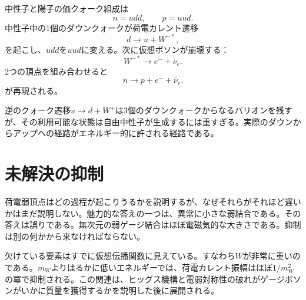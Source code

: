 中性子と陽子の価クォーク組成は
\begin{equation}
n=udd,
\qquad
p=uud.
\end{equation}
中性子中の1個のダウンクォークが荷電カレント遷移
\begin{equation}
d\longrightarrow u+W^{-*},
\end{equation}
を起こし、\(udd\)を\(uud\)に変える。次に仮想ボソンが崩壊する：
\begin{equation}
W^{-*}\longrightarrow e^-+\bar\nu_e.
\end{equation}
2つの頂点を組み合わせると
\begin{equation}
n\longrightarrow p+e^-+\bar\nu_e.
\end{equation}
が再現される。

逆のクォーク遷移\(u\to d+W^+\)は3個のダウンクォークからなるバリオンを残すが、その利用可能な状態は自由中性子が生成するには重すぎる。実際のダウンからアップへの経路がエネルギー的に許される経路である。

\begin{classroomqa}
\end{classroomqa}

\section{未解決の抑制}

荷電弱頂点はどの過程が起こりうるかを説明するが、なぜそれらがそれほど遅いかはまだ説明しない。魅力的な答えの一つは、異常に小さな弱結合である。その答えは誤りである。無次元の弱ゲージ結合はほぼ電磁気的な大きさである。抑制は別の何かから来なければならない。

欠けている要素はすでに仮想伝播関数に見えている。すなわち\(W\)が非常に重いのである。\(m_W\)よりはるかに低いエネルギーでは、荷電カレント振幅はほぼ\(1/m_W^2\)の冪で抑制される。この関連は、ヒッグス機構と電弱対称性の破れがゲージボソンがいかに質量を獲得するかを説明した後に展開される。

